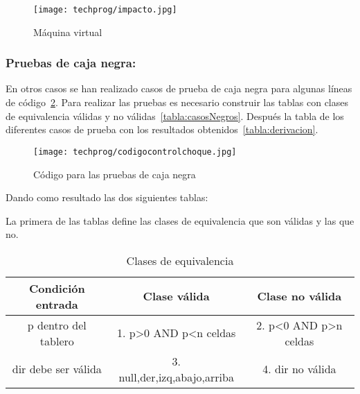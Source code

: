 \begin{figure}[H]
	\centering
	\texttt{[image: techprog/impacto.jpg]}
	\caption{Máquina virtual}\label{fig:impacto}
\end{figure}

\subsubsection{Pruebas de caja negra:}
En otros casos se han realizado casos de prueba de caja negra para algunas líneas de código~\ref{fig:codigocontrolchoque}. Para realizar las pruebas es necesario construir las tablas con clases de equivalencia válidas y no válidas~\ref{tabla:casosNegros}. Después la tabla de los diferentes casos de prueba con los resultados obtenidos~\ref{tabla:derivacion}.

\begin{figure}[H]
	\centering
	\texttt{[image: techprog/codigocontrolchoque.jpg]}
	\caption{Código para las pruebas de caja negra}\label{fig:codigocontrolchoque}
\end{figure}

Dando como resultado las dos siguientes tablas:

La primera de las tablas define las clases de equivalencia que son válidas y las que no.
\begin{table}[H]
	\begin{center}
		\begin{tabular}{ccc}
			\hline
			Condición entrada		& Clase válida		& Clase no válida \\ \hline
			p dentro del tablero	&1. p>0 AND p<n celdas		&2. p<0 AND p>n celdas\\
			dir debe ser válida		&3. null,der,izq,abajo,arriba		&4. dir no válida\\
		\end{tabular}
		\caption{Clases de equivalencia}
		\label{table:casosNegros}
	\end{center}
\end{table}

